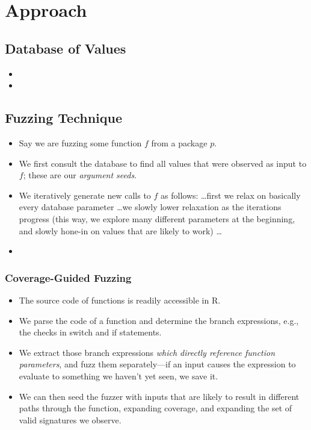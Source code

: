 \section{Approach}

\subsection{Database of Values}

\begin{itemize}
    \item {}
    \item {}
\end{itemize}

\subsection{Fuzzing Technique}

\begin{itemize}
    \item Say we are fuzzing some function $f$ from a package $p$.
    \item We first consult the database to find all values that were observed as input to $f$; these are our \textit{argument seeds}.
    \item We iteratively generate new calls to $f$ as follows: \ldots first we relax on basically every database parameter \ldots we slowly lower relaxation as the iterations progress (this way, we explore many different parameters at the beginning, and slowly hone-in on values that are likely to work) \ldots
    \item {}
\end{itemize}

\subsubsection{Coverage-Guided Fuzzing}

\begin{itemize}
    \item The source code of functions is readily accessible in R.
    \item We parse the code of a function and determine the branch expressions, e.g., the checks in switch and if statements.
    \item We extract those branch expressions \textit{which directly reference function parameters}, and fuzz them separately---if an input causes the expression to evaluate to something we haven't yet seen, we save it.
    \item We can then seed the fuzzer with inputs that are likely to result in different paths through the function, expanding coverage, and expanding the set of valid signatures we observe.
\end{itemize}